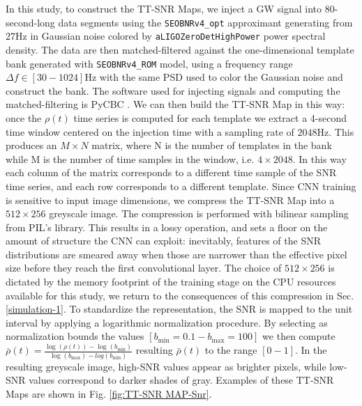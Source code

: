 \documentclass[aps,prd,twocolumn,superscriptaddress,nofootinbib, longbibliography]{revtex4-2}
\begin{document}
	In this study, to construct the TT-SNR Maps, we inject a GW signal into 80-second-long data segments using the \texttt{SEOBNRv4\_opt} approximant generating from $27$Hz in Gaussian noise colored by \texttt{aLIGOZeroDetHighPower} power spectral density. The data are then matched-filtered against the one-dimensional template bank  generated with \texttt{SEOBNRv4\_ROM} \cite{seobnrv4rom} model, using a frequency range $\Delta f \in [30-1024] \mathrm{Hz}$ with the same PSD used to color the Gaussian noise and construct the bank. The software used for injecting signals and computing the matched-filtering is PyCBC \cite{pycbc-software}. 
	We can then build the TT-SNR Map in this way: once the $\rho(t)$ time series is computed for each template we extract a 4-second time window centered on the injection time with a sampling rate of $2048$Hz. This produces an $M\times N$ matrix, where N is the number of templates in the bank while M is the number of time samples in the window, i.e. $4 \times 2048$. In this way each column of the matrix corresponds to a different time sample of the SNR time series, and each row corresponds to a different template.
	Since CNN training is sensitive to input image dimensions, we compress the TT-SNR Map into a $512 \times 256$ greyscale image. The compression is performed with bilinear sampling from PIL's library. This results in a lossy operation, and sets a floor on the amount of structure the CNN can exploit: inevitably, features of the SNR distributions are smeared away when those are narrower than the effective pixel size before they reach the first convolutional layer. The choice of $512 \times 256$ is dictated by the memory footprint of the training stage on the CPU resources available for this study, we return to the consequences of this compression in Sec. \ref{simulation-1}. To standardize the representation, the SNR is mapped to the unit interval by applying a logarithmic normalization procedure. By selecting as normalization bounds the values $[b_\mathrm{min} = 0.1 - b_\mathrm{max} = 100]$ we then compute $\bar{\rho}(t) = \frac{\log (\rho(t)) - \log(b_\mathrm{\min})}{\log (b_\mathrm{max}) - log(b_\mathrm{\min})}$ resulting $\bar{\rho}(t)$ to the range $[0 - 1]$. In the resulting greyscale image, high-SNR values appear as brighter pixels, while low-SNR values correspond to darker shades of gray. Examples of these TT-SNR Maps are shown in Fig. \ref{fig:TT-SNR MAP-Snr}. 
	
\end{document}
